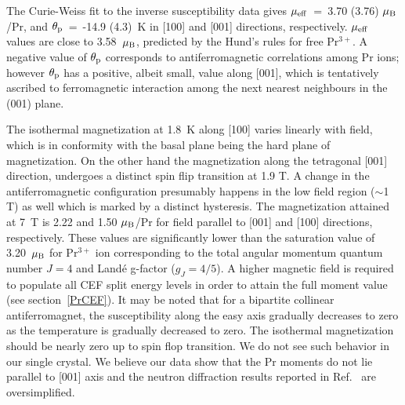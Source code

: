 \documentclass[preprint,showpacs,preprintnumbers,amsmath,amssymb, prb]{revtex4}
\begin{document}
The Curie-Weiss fit to the inverse susceptibility data gives $\mu_{\rm eff}$~=~3.70 (3.76) $\mu_{\rm B}$/Pr, and $\theta_{\rm p}$~=~-14.9 (4.3)~K in [100] and [001] directions, respectively. $\mu_{\rm eff}$ values are close to 3.58~$\mu_{\rm B}$, predicted by the Hund's rules for free Pr$^{3+}$. A negative value of $\theta_{\rm p}$ corresponds to antiferromagnetic correlations among Pr ions; however $\theta_{\rm p}$ has a positive, albeit small, value along [001], which is tentatively ascribed to ferromagnetic interaction among the next nearest neighbours in the (001) plane.

The isothermal magnetization at 1.8~K along [100] varies linearly with field, which is in conformity with the basal plane being the hard plane of magnetization. On the other hand the magnetization along the tetragonal [001] direction, undergoes a distinct  spin flip transition at 1.9 T. A change in the antiferromagnetic configuration presumably happens in the low field region ($\sim$1 T) as well which is marked by a distinct hysteresis. The magnetization attained at 7~T is 2.22 and 1.50 $\mu_{\rm B}$/Pr for field parallel to [001] and [100] directions, respectively. These values are significantly lower than the saturation value of 3.20~$\mu_{\rm B}$ for Pr$^{3+}$ ion corresponding to the total angular momentum quantum number $J=4$ and Land{\'e} g-factor ($g_J=4/5$). A higher magnetic field is required to populate all CEF split energy levels in order to attain the full moment value (see section~\ref{PrCEF}).  It may be noted that for a bipartite collinear antiferromagnet, the susceptibility along the easy axis gradually decreases to zero as the temperature is gradually decreased to zero. The isothermal magnetization should be nearly zero up to spin flop transition. We do not see such behavior in our single crystal. We believe our data show that the Pr moments do not lie parallel to [001] axis and the neutron diffraction results reported in Ref.~ are oversimplified. 
\end{document}
